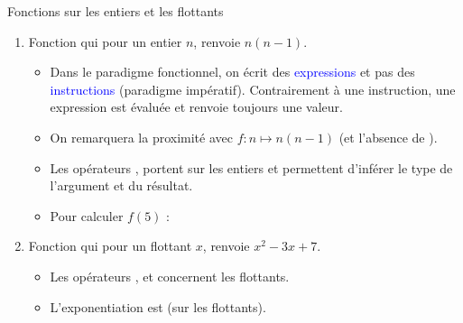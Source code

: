 \documentclass[10pt]{beamer}
\begin{document}
\begin{frame}{\Ctitle}{\stitle}
	\begin{exampleblock}{Fonctions sur les entiers et les flottants}
		\begin{enumerate}
			\item<1-> Fonction qui pour un entier $n$, renvoie $n(n-1)$.
				\begin{itemize}
					\item<2->{\textcolor{BrickRed}{\danger} Dans le paradigme fonctionnel, on écrit des \textcolor{blue}{expressions} et pas des \textcolor{blue}{instructions} (paradigme impératif). Contrairement à une instruction, une expression est évaluée et renvoie toujours une valeur.}
					\item<3->{ On remarquera la proximité avec  $f : n \mapsto n(n-1)$ (et l'absence de  ).}
					\item<4->{ Les opérateurs \kw{*}, \kw{-} portent sur les entiers et permettent d'inférer le type de l'argument et du résultat.}
					\item<5->{ Pour calculer $f(5)$ : }
				\end{itemize}
			\item<6-> Fonction qui pour un flottant $x$, renvoie $x^2-3x+7$.
				\begin{itemize}
					\item<7-> Les opérateurs ,  et  concernent les flottants.
					\item<8-> L'exponentiation est \kw{**} (sur les flottants).
				\end{itemize}
		\end{enumerate}
	\end{exampleblock}
\end{frame}
\end{document}

